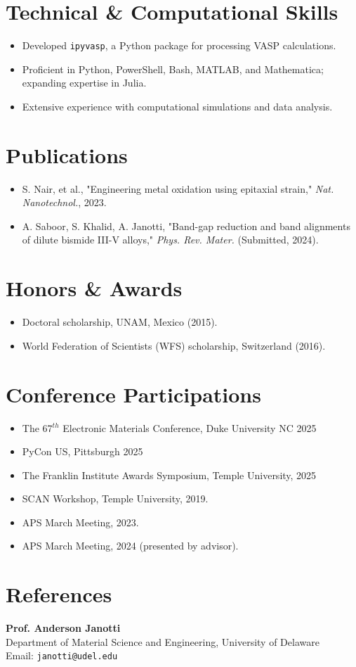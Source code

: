 \documentclass[letter,11pt]{article}
\begin{document}
\section{Technical \& Computational Skills}
\begin{itemize}
\item Developed \texttt{ipyvasp}, a Python package for processing VASP calculations.
\item Proficient in Python, PowerShell, Bash, MATLAB, and Mathematica; expanding expertise in Julia.
\item Extensive experience with computational simulations and data analysis.
\end{itemize}

\section{Publications}
\begin{itemize}
    \item S. Nair, et al., "Engineering metal oxidation using epitaxial strain," \textit{Nat. Nanotechnol.}, 2023.
    \item A. Saboor, S. Khalid, A. Janotti, "Band-gap reduction and band alignments of dilute bismide III-V alloys," \textit{Phys. Rev. Mater.} (Submitted, 2024).
\end{itemize}

\section{Honors \& Awards}
\begin{itemize}
\item Doctoral scholarship, UNAM, Mexico (2015).
\item World Federation of Scientists (WFS) scholarship, Switzerland (2016).
\end{itemize}

\section{Conference Participations}
\begin{itemize}
\item The 67$^{th}$ Electronic Materials Conference, Duke University NC 2025
\item PyCon US, Pittsburgh 2025
\item The Franklin Institute Awards Symposium, Temple University, 2025
\item SCAN Workshop, Temple University, 2019.
\item APS March Meeting, 2023.
\item APS March Meeting, 2024 (presented by advisor).
\end{itemize}

\section{References}
\textbf{Prof. Anderson Janotti} \\
Department of Material Science and Engineering, University of Delaware \\
Email: \texttt{janotti@udel.edu}
\end{document}
